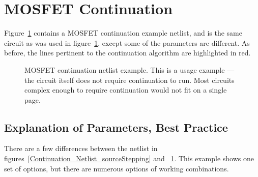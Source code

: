 \newpage 
\section{MOSFET Continuation}
\label{continuation_mosfet}

Figure~\ref{Continuation_Netlist_mos} contains a MOSFET continuation example netlist, and is the same circuit as was used in figure~\ref{Continuation_Netlist_mos}, except some of the parameters are different.  As before, the lines pertinent to the continuation algorithm are highlighted in red.  

\begin{figure}[htbp]
\begin{centering}
\caption[MOSFET continuation netlist example.]{MOSFET continuation netlist example. 
This is a usage example --- the circuit itself does not require continuation to run. Most circuits complex enough to require continuation would not fit on a single page.  
\label{Continuation_Netlist_mos}}
\end{centering}
\end{figure}

\subsection{Explanation of Parameters, Best Practice}

There are a few differences between the netlist in figures~\ref{Continuation_Netlist_sourceStepping} and ~\ref{Continuation_Netlist_mos}. This example shows one set of options, but there are numerous options of working combinations.  

